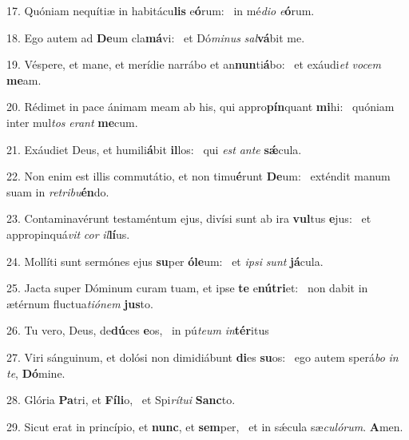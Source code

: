 17. Quóniam nequítiæ in habitácu\textbf{lis} e\textbf{ó}rum: \ast\  in mé\textit{di}\textit{o} \textit{e}\textbf{ó}rum.\

18. Ego autem ad \textbf{De}um cla\textbf{má}vi: \ast\  et Dó\textit{mi}\textit{nus} \textit{sal}\textbf{vá}bit me.\

19. Véspere, et mane, et merídie narrábo et an\textbf{nun}ti\textbf{á}bo: \ast\  et exáudi\textit{et} \textit{vo}\textit{cem} \textbf{me}am.\

20. Rédimet in pace ánimam meam ab his, qui appro\textbf{pín}quant \textbf{mi}hi: \ast\  quóniam inter mul\textit{tos} \textit{e}\textit{rant} \textbf{me}cum.\

21. Exáudiet Deus, et humili\textbf{á}bit \textbf{il}los: \ast\  qui \textit{est} \textit{an}\textit{te} \textbf{sǽ}cula.\

22. Non enim est illis commutátio, et non timu\textbf{é}runt \textbf{De}um: \ast\  exténdit manum suam in \textit{re}\textit{tri}\textit{bu}\textbf{én}do.\

23. Contaminavérunt testaméntum ejus, divísi sunt ab ira \textbf{vul}tus \textbf{e}jus: \ast\  et appropinquá\textit{vit} \textit{cor} \textit{il}\textbf{lí}us.\

24. Mollíti sunt sermónes ejus \textbf{su}per \textbf{ó}\textbf{le}um: \ast\  et \textit{ip}\textit{si} \textit{sunt} \textbf{já}cula.\

25. Jacta super Dóminum curam tuam, et ipse \textbf{te} e\textbf{nú}\textbf{tri}et: \ast\  non dabit in ætérnum fluctua\textit{ti}\textit{ó}\textit{nem} \textbf{jus}to.\

26. Tu vero, Deus, de\textbf{dú}ces \textbf{e}os, \ast\  in pú\textit{te}\textit{um} \textit{in}\textbf{tér}itus\

27. Viri sánguinum, et dolósi non dimidiábunt \textbf{di}es \textbf{su}os: \ast\  ego autem sperá\textit{bo} \textit{in} \textit{te}, \textbf{Dó}mine.\

28. Glória \textbf{Pa}tri, et \textbf{Fí}\textbf{li}o, \ast\  et Spi\textit{rí}\textit{tu}\textit{i} \textbf{Sanc}to.\

29. Sicut erat in princípio, et \textbf{nunc}, et \textbf{sem}per, \ast\  et in sǽcula sæ\textit{cu}\textit{ló}\textit{rum}. \textbf{A}men.\

